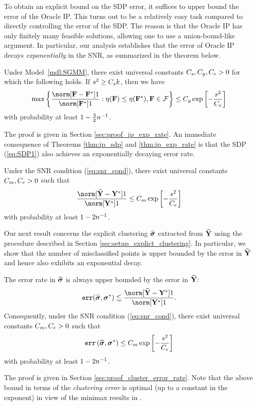 To obtain an explicit bound on the SDP error, it suffices to upper
bound the error of the Oracle IP. This turns out to be a relatively
easy task compared to directly controlling the error of the SDP. The
reason is that the Oracle IP has only finitely many feasible solutions,
allowing one to use a union-bound-like argument. In particular, our
analysis establishes that the error of Oracle IP decays \emph{exponentially}
in the SNR, as summarized in the theorem below.
\begin{thm}
\label{thm:ip_exp_rate} Under Model~\ref{mdl:SGMM}, there exist
universal constants $C_{s},C_{g},C_{e}>0$ for which the
following holds. If $s^{2}\ge C_{s}k$, then we have 
\[
\max\left\{ \frac{\norm[\F-\F^{*}]1}{\norm[\F^{*}]1}:\eta(\F)\le\eta(\F^{*}),\F\in\mathcal{F}\right\} \le\constgamma\exp\left[-\frac{\snr^{2}}{\conste}\right]
\]
with probability at least $1-\frac{3}{2}n^{-1}$.
\end{thm}
The proof is given in Section \ref{sec:proof_ip_exp_rate}. An immediate
consequence of Theorems \ref{thm:ip_sdp} and \ref{thm:ip_exp_rate}
is that the SDP (\ref{eq:SDP1}) also achieves an exponentially decaying
error rate.
\begin{cor}
 \label{cor:SDP_exp_rate} Under the SNR condition (\ref{eq:snr_cond}),
there exist universal constants $C_{m},C_{e}>0$ such that 
\[
\frac{\norm[\Yhat-\Ystar]1}{\norm[\Ystar]1}\leq\constmis\exp\left[-\frac{\snr^{2}}{\conste}\right]
\]
with probability at least $1-2n^{-1}$.
\end{cor}
Our next result concerns the explicit clustering $\widehat{\boldsymbol{\sigma}}$ extracted
from $\widehat{\mathbf{Y}}$ using the procedure described in Section \ref{sec:setup_explict_clustering}.
In particular, we show that the number of misclassified points is
upper bounded by the error in $\widehat{\mathbf{Y}}$ and hence also exhibits an
exponential decay.
\begin{thm}
\emph{}\label{thm:cluster_error_rate} The error rate in $\widehat{\boldsymbol{\sigma}}$
is always upper bounded by the error in $\widehat{\mathbf{Y}}$:
\[
\misrate(\LabelHat,\LabelStar)\lesssim\frac{\norm[\Yhat-\Ystar]1}{\norm[\Ystar]1}.
\]
Consequently, under the SNR condition (\ref{eq:snr_cond}), there
exist universal constants $C_{m},C_{e}>0$ such that 
\[
\operatorname*{\texttt{err}}\left(\widehat{\boldsymbol{\sigma}},\boldsymbol{\sigma}^{*}\right)\leq C_{m}\exp\left[-\frac{s^{2}}{C_{e}}\right]
\]
with probability at least $1-2n^{-1}$.
\end{thm}
The proof is given in Section \ref{sec:proof_cluster_error_rate}.
 Note that the above bound in terms of the \emph{clustering error}
is optimal (up to a constant in the exponent) in view of the minimax
results in \citet{lu2016lloyd}. 

